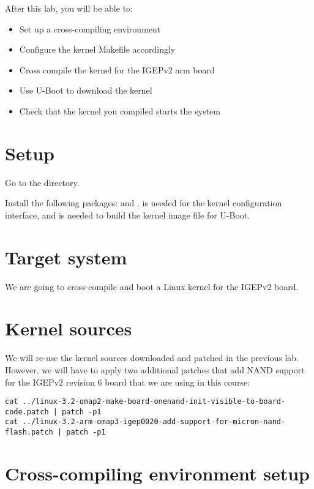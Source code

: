 
After this lab, you will be able to:
\begin{itemize}
\item Set up a cross-compiling environment
\item Configure the kernel Makefile accordingly
\item Cross compile the kernel for the IGEPv2 arm board
\item Use U-Boot to download the kernel
\item Check that the kernel you compiled starts the system
\end{itemize}

\section{Setup}

Go to the  directory.

Install the following packages:  and
.  is needed for the
 kernel configuration interface, and 
is needed to build the  kernel image file for U-Boot.

\section{Target system}

We are going to cross-compile and boot a Linux kernel for the IGEPv2
board.

\section{Kernel sources}

We will re-use the kernel sources downloaded and patched in the
previous lab. However, we will have to apply two additional patches
that add NAND support for the IGEPv2 revision 6 board that we are
using in this course:

\small
\begin{verbatim}
cat ../linux-3.2-omap2-make-board-onenand-init-visible-to-board-code.patch | patch -p1
cat ../linux-3.2-arm-omap3-igep0020-add-support-for-micron-nand-flash.patch | patch -p1
\end{verbatim}
\normalsize

\section{Cross-compiling environment setup}

